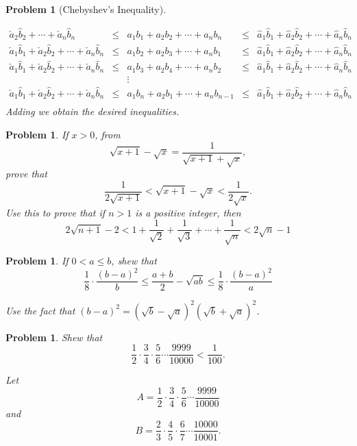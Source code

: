 \documentclass[11pt, openany]{book}
\theoremstyle{change} \theoremheaderfont{\blue\sffamily\bfseries}
\newtheorem{pro}[thm]{Problem}
\theoremstyle{nonumberplain} \theoremheaderfont{\sffamily\bfseries}
\newcommand{\í}{\'{\i}}
\begin{document}
\begin{multicols}{2}
\begin{pro}[Chebyshev's Inequality]
\begin{answer}
$$\begin{array}{lllll}
\check{a}_2\hat{b}_2+\cdots + \check{a}_n\hat{b}_n &  \leq  &
a_1b_1+a_2b_2+ \cdots + a_nb_n & \leq & \hat{a}_1\hat{b}_1+
\hat{a}_2\hat{b}_2+\cdots + \hat{a}_n\hat{b}_n\\
\check{a}_1\hat{b}_1+ \check{a}_2\hat{b}_2+\cdots +
\check{a}_n\hat{b}_n &  \leq  & a_1b_2+a_2b_3+ \cdots + a_nb_1 &
\leq & \hat{a}_1\hat{b}_1+
\hat{a}_2\hat{b}_2+\cdots + \hat{a}_n\hat{b}_n\\
\check{a}_1\hat{b}_1+ \check{a}_2\hat{b}_2+\cdots +
\check{a}_n\hat{b}_n &  \leq  & a_1b_3+a_2b_4+ \cdots + a_nb_2 &
\leq & \hat{a}_1\hat{b}_1+
\hat{a}_2\hat{b}_2+\cdots + \hat{a}_n\hat{b}_n\\
& & \vdots & & \\
\check{a}_1\hat{b}_1+ \check{a}_2\hat{b}_2+\cdots +
\check{a}_n\hat{b}_n &  \leq  & a_1b_n+a_2b_1+ \cdots + a_nb_{n-1} &
\leq & \hat{a}_1\hat{b}_1+
\hat{a}_2\hat{b}_2+\cdots + \hat{a}_n\hat{b}_n\\
\end{array}$$
Adding we obtain the desired inequalities.

\end{answer}
\end{pro}
\begin{pro}
If $x > 0$, from
$$\sqrt{x + 1} - \sqrt{x} = \frac{1}{\sqrt{x + 1} + \sqrt{x}},$$prove that
$$\frac{1}{2\sqrt{x + 1}} < \sqrt{x + 1} - \sqrt{x} < \frac{1}{2\sqrt{x}}.$$
Use this to prove that if  $n > 1$ is a positive integer, then
$$2\sqrt{n + 1} - 2 < 1 + \frac{1}{\sqrt{2}} + \frac{1}{\sqrt{3}} + \cdots + \frac{1}{\sqrt{n}}  < 2\sqrt{n} - 1$$
\end{pro}
\begin{pro}
If $0 < a \leq b$, shew that
$$\frac{1}{8}\cdot\frac{(b - a)^2}{b} \leq \frac{a + b}{2} - \sqrt{ab} \leq \frac{1}{8}\cdot\frac{(b - a)^2}{a} $$
\begin{answer}
Use the fact that $(b - a)^2 = (\sqrt{b} - \sqrt{a})^2(\sqrt{b} +
\sqrt{a})^2$.
\end{answer}
\end{pro}
\begin{pro}
Shew that $$\frac{1}{2}\cdot\frac{3}{4}\cdot\frac{5}{6}\cdots
\frac{9999}{10000} < \frac{1}{100}.$$ \begin{answer} Let
$$A = \frac{1}{2}\cdot\frac{3}{4}\cdot\frac{5}{6}\cdots \frac{9999}{10000} $$
and
$$ B =\frac{2}{3}\cdot\frac{4}{5}\cdot\frac{6}{7}\cdots\frac{10000}{10001}.$$

\bigskip


\end{answer}
\end{pro}
\end{multicols}
\end{document}

